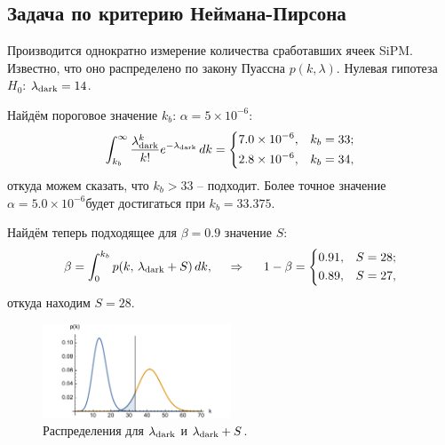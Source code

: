 

\subsection*{Задача по критерию Неймана-Пирсона}

Производится однократно измерение количества сработавших ячеек SiPM. Известно, что оно распределено по закону Пуассна $p(k, \lambda)$. 
Нулевая гипотеза $H_0$: $\lambda_{\textnormal{dark}} = 14$. 

Найдём пороговое значение $k_b$: $\alpha = 5 \times  10^{-6}$:
\begin{equation*}
    \int_{k_b}^{\infty} \frac{\lambda_{\textnormal{dark}}^k}{k!} e^{-\lambda_{\textnormal{dark}}} \, d k = 
    \left\{\begin{aligned}
        &7.0 \times 10^{-6}, &k_b = 33; \\
        &2.8 \times 10^{-6}, &k_b = 34,
    \end{aligned}\right.
\end{equation*}
откуда можем сказать, что $k_b > 33$ -- подходит. Более точное значение $\alpha = 5.0 \times  10^{-6}$будет достигаться при  $k_b = 33.375$.

Найдём теперь подходящее для $\beta = 0.9$ значение $S$:
\begin{equation*}
    \beta = \int_{0}^{k_b} p(k,\, \lambda_{\textnormal{dark}} + S) \, d k,
    \hspace{0.5cm} \Rightarrow \hspace{0.5cm}
    1-\beta = \left\{\begin{aligned}
        &0.91, &S=28; \\
        &0.89, &S=27,
    \end{aligned}\right.
\end{equation*}
откуда находим $S = 28$.

\begin{figure}[h]
    \centering
    \includegraphics[width=0.5\textwidth]{mrc.pdf}
    \caption{Распределения для $\lambda_{\textnormal{dark}}$ и $\lambda_{\textnormal{dark}} + S$.}
\end{figure}




